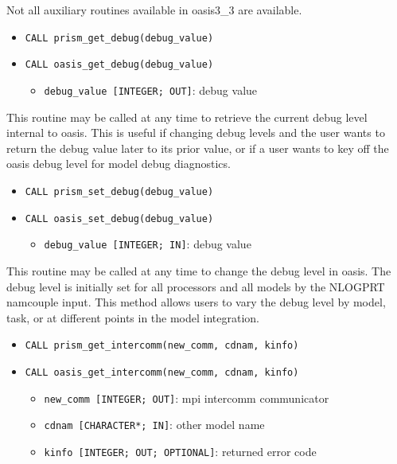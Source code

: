 Not all auxiliary routines available in oasis3\_3 are available.

\begin{itemize} 
\item {\tt CALL prism\_get\_debug(debug\_value)}
\item {\tt CALL oasis\_get\_debug(debug\_value)}
\begin{itemize}
\item {\tt debug\_value [INTEGER; OUT]}: debug value
\end{itemize}
\end{itemize}

This routine may be called at any time to retrieve the current
debug level internal to oasis.  This is useful if changing debug
levels and the user wants to return the debug value later to
its prior value, or if a user wants to key off the oasis
debug level for model debug diagnostics.

\begin{itemize} 
\item {\tt CALL prism\_set\_debug(debug\_value)}
\item {\tt CALL oasis\_set\_debug(debug\_value)}
\begin{itemize}
\item {\tt debug\_value [INTEGER; IN]}: debug value
\end{itemize}
\end{itemize}

This routine may be called at any time to change the debug level in oasis.
The debug level is initially set for all processors and all models
by the NLOGPRT namcouple input.  This method allows users to vary 
the debug level by model, task, or at different points in the model
integration.

\begin{itemize} 
\item {\tt CALL prism\_get\_intercomm(new\_comm, cdnam, kinfo)}
\item {\tt CALL oasis\_get\_intercomm(new\_comm, cdnam, kinfo)}
\begin{itemize}
\item {\tt new\_comm [INTEGER; OUT]}: mpi intercomm communicator
\item {\tt cdnam [CHARACTER*; IN]}: other model name 
\item {\tt kinfo [INTEGER; OUT; OPTIONAL]}: returned error code
\end{itemize}
\end{itemize}

